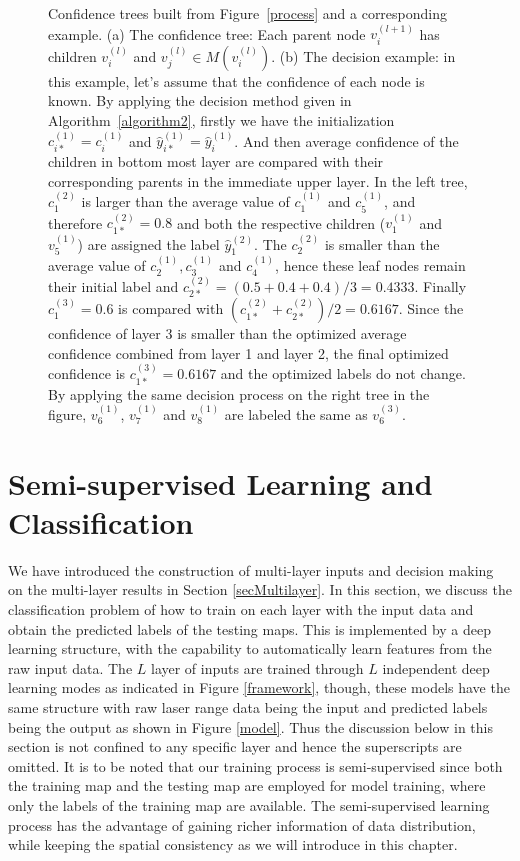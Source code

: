 \documentclass[letterpaper, 10 pt, conference]{ieeeconf}  %
\begin{document}
\begin{figure}[tpb]
\centering
{}
\caption{Confidence trees built from Figure~\ref{process} and a corresponding example. (a) The confidence tree: Each parent node $v_i^{(l+1)}$ has children $v_i^{(l)}$ and $v_j^{(l)}\in M(v_i^{(l)})$. (b) The decision example: in this example, let's assume that the confidence of each node is known. By applying the decision method given in Algorithm~\ref{algorithm2}, firstly we have the initialization $c_{i*}^{(1)} = c_i^{(1)}$ and $\hat{y}_{i*}^{(1)} = \hat{y}_i^{(1)}$. And then average confidence of the children in bottom most layer are compared with their corresponding parents in the immediate upper layer. In the left tree, $c_1^{(2)}$ is larger than the average value of $c_1^{(1)}$ and $c_5^{(1)}$, and therefore $c_{1*}^{(2)}=0.8$ and both the respective children ($v_1^{(1)}$ and $v_5^{(1)}$) are assigned the label $\hat{y}_{1}^{(2)}$. The $c_2^{(2)}$  is smaller than the average value of $c_2^{(1)},c_3^{(1)}$ and $c_4^{(1)}$, hence these leaf nodes remain their initial label and $c_{2*}^{(2)}=(0.5+0.4+0.4)/3=0.4333$. Finally $c_1^{(3)}=0.6$ is compared with $(c_{1*}^{(2)}+c_{2*}^{(2)})/2=0.6167$. Since the confidence of layer 3 is smaller than the optimized average confidence combined from layer 1 and layer 2, the final optimized confidence is $c_{1*}^{(3)}=0.6167$ and the optimized labels do not change. By applying the same decision process on the right tree in the figure, $v_6^{(1)}$, $v_7^{(1)}$ and $v_8^{(1)}$ are labeled the same as $v_6^{(3)}$.}
\label{tree}
\end{figure}


\section{Semi-supervised Learning and Classification} \label{secSemi}

We have introduced the construction of multi-layer inputs and decision making on the multi-layer results in Section \ref{secMultilayer}. In this section, we discuss the classification problem of how to train on each layer with the input data and obtain the predicted labels of the testing maps. This is implemented by a deep learning structure, with the capability to automatically learn features from the raw input data. The $L$ layer of inputs are trained through $L$ independent deep learning modes as indicated in Figure \ref{framework}, though, these models have the same structure with raw laser range data being the input and predicted labels being the output as shown in Figure \ref{model}. Thus the discussion below in this section is not confined to any specific layer and hence the superscripts are omitted. It is to be noted that our training process is semi-supervised since both the training map and the testing map are employed for model training, where only the labels of the training map are available. The semi-supervised learning process has the advantage of gaining richer information of data distribution, while keeping the spatial consistency as we will introduce in this chapter.
\end{document}
